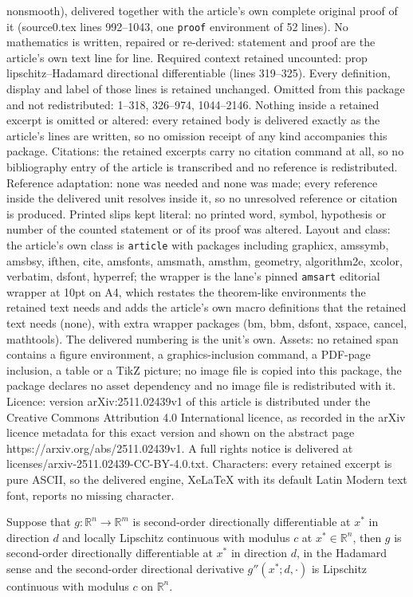\documentclass[10pt,a4paper]{amsart}
\begin{document}
{nonsmooth}), delivered together with the article's own complete original proof of it (source0.tex lines 992--1043, one \texttt{proof} environment of 52 lines). No mathematics is written, repaired or re-derived: statement and proof are the article's own text line for line. Required context retained uncounted: prop lipschitz--Hadamard directional differentiable (lines 319--325). Every definition, display and label of those lines is retained unchanged. Omitted from this package and not redistributed: 1--318, 326--974, 1044--2146. Nothing inside a retained excerpt is omitted or altered: every retained body is delivered exactly as the article's lines are written, so no omission receipt of any kind accompanies this package. Citations: the retained excerpts carry no citation command at all, so no bibliography entry of the article is transcribed and no reference is redistributed. Reference adaptation: none was needed and none was made; every reference inside the delivered unit resolves inside it, so no unresolved reference or citation is produced. Printed slips kept literal: no printed word, symbol, hypothesis or number of the counted statement or of its proof was altered. Layout and class: the article's own class is \texttt{article} with packages including graphicx, amssymb, amsbsy, ifthen, cite, amsfonts, amsmath, amsthm, geometry, algorithm2e, xcolor, verbatim, dsfont, hyperref; the wrapper is the lane's pinned \texttt{amsart} editorial wrapper at 10pt on A4, which restates the theorem-like environments the retained text needs and adds the article's own macro definitions that the retained text needs (none), with extra wrapper packages (bm, bbm, dsfont, xspace, cancel, mathtools). The delivered numbering is the unit's own. Assets: no retained span contains a figure environment, a graphics-inclusion command, a PDF-page inclusion, a table or a TikZ picture; no image file is copied into this package, the package declares no asset dependency and no image file is redistributed with it. Licence: version arXiv:2511.02439v1 of this article is distributed under the Creative Commons Attribution 4.0 International licence, as recorded in the arXiv licence metadata for this exact version and shown on the abstract page https://arxiv.org/abs/2511.02439v1. A full rights notice is delivered at licenses/arxiv-2511.02439-CC-BY-4.0.txt. Characters: every retained excerpt is pure ASCII, so the delivered engine, XeLaTeX with its default Latin Modern text font, reports no missing character.
\begin{proposition}\label{prop lipschitz--Hadamard directional differentiable}
  Suppose that $g:\mathbb{R}^n\to \mathbb{R}^m$ is second-order directionally
differentiable at $x^*$ in direction $d$ and locally Lipschitz continuous
 with  modulus $c$ at $x^*\in\mathbb{R}^n$, then $g$ is second-order directionally differentiable at $x^*$ in
direction $d$, in the Hadamard sense and
the second-order directional derivative $g''(x^*;d,\cdot)$ is Lipschitz continuous with modulus $c$ on $\mathbb{R}^n$.
\end{proposition}
\end{document}
